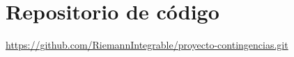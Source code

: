 \documentclass{article}
\begin{document}
\thispagestyle{firstpage}
\vspace*{9\baselineskip}
\graphicspath{ {./figures/} }

\renewcommand{\contentsname}{}
\setcounter{tocdepth}{2} %
\begin{cuadrocontenido}
  \tableofcontents
\end{cuadrocontenido}



\section*{Repositorio de código}

\url{https://github.com/RiemannIntegrable/proyecto-contingencias.git}

\newpage




\renewcommand\bibname{Bibliografía}



\end{document}
